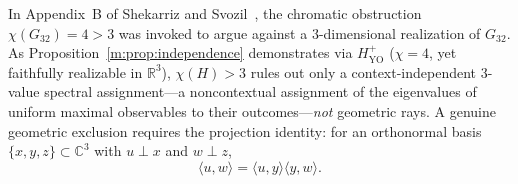 \documentclass[aps,pra,reprint,superscriptaddress,longbibliography,nofootinbib,floatfix,10pt]{revtex4-2}
\theoremstyle{definition}\newtheorem{definition}[theorem]{Definition}
\theoremstyle{remark}\newtheorem{remark}[theorem]{Remark}
\newcommand{\C}{\mathbb C}\newcommand{\R}{\mathbb R}\newcommand{\Q}{\mathbb Q}
\newcommand{\YO}{\mathrm{YO}}\newcommand{\ip}[2]{\langle #1,#2\rangle}
\begin{document}
In Appendix~B of Shekarriz and Svozil~\cite{svozil-2021-chroma}, the chromatic obstruction $\chi(G_{32})=4>3$ was invoked to argue against a $3$-dimensional realization of $G_{32}$. As Proposition~\ref{m:prop:independence} demonstrates via $H_{\YO}^{+}$ ($\chi=4$, yet faithfully realizable in $\R^3$), $\chi(H)>3$ rules out only a context-independent $3$-value spectral assignment---a noncontextual assignment of the eigenvalues of uniform maximal observables to their outcomes---\emph{not} geometric rays. A genuine geometric exclusion requires the projection identity: for an orthonormal basis $\{x,y,z\}\subset\C^3$ with $u\perp x$ and $w\perp z$,
\begin{equation}\label{m:eq:projection-identity}
\ip{u}{w}=\ip{u}{y}\ip{y}{w}.
\end{equation}
\end{document}
